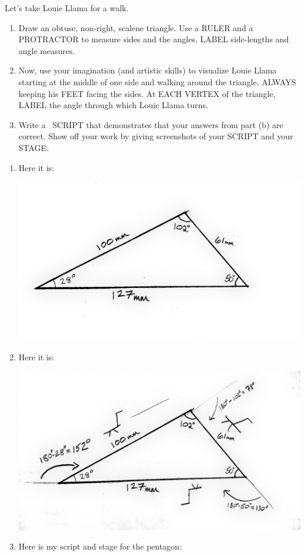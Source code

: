 \documentclass[nooutcomes,noauthor]{ximera}
\begin{document}
\begin{question}
  Let's take Louie Llama for a walk.
  \begin{enumerate}
  \item Draw an obtuse, non-right, scalene triangle. Use a RULER and a
    PROTRACTOR to measure sides and the angles. LABEL side-lengths and
    angle measures.
  \item Now, use your imagination (and artistic skills) to visualize
    Louie Llama starting at the middle of one side and walking around
    the triangle, ALWAYS keeping his FEET facing the sides. At EACH
    VERTEX of the triangle, LABEL the angle through which Louie Llama
    turns.
  \item Write a \snap\ SCRIPT that demonstrates that your answers from
    part (b) are correct. Show off your work by giving screenshots of
    your SCRIPT and your STAGE.
  \end{enumerate}
  \begin{freeResponse}
    \begin{enumerate}
    \item Here it is:
      \begin{center}
        \includegraphics[width=.4\textwidth]{specificTri.jpg}
      \end{center}
    \item Here it is:
      \begin{center}
        \includegraphics[width=.4\textwidth]{llamaAndSpecificTri.jpg}
      \end{center}
    \item Here is my script and stage for the pentagon:
      \begin{center}

\end{center}
\end{enumerate}
\end{freeResponse}
\end{question}
\end{document}
